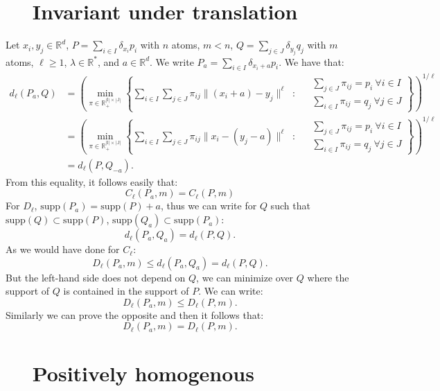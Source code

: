 \documentclass{amsart}
\newcommand{\RR}{\mathbb{R}}
\begin{document}
\begin{appendices}
\section{$\quad$ Invariant under translation }\label{appendix restrict}
\noindent Let $x_i,y_j\in\RR^d$, $P=\sum_{i\in I}\delta_{x_i}p_i$ with $n$ atoms, $m<n$, $Q=\sum_{j\in J}\delta_{y_j}q_j$ with $m$ atoms, $\ell\geq1$, $\lambda\in\RR^*$, and $a\in\RR^d$. We write $P_a=\sum_{i\in I}\delta_{x_i+a}p_i$. We have that:
\begin{align*}
d_\ell(P_a,Q)&=\left(\min_{\pi\in\mathbb{R_+^{|I|\times|J|}}}\left\{ 
\sum_{i\in I}\sum_{j\in J}\pi_{ij}\lVert \left(x_i+a\right)-y_j\rVert^\ell \: \text{ : } \:  \begin{aligned}
& \sum_{j\in J}\pi_{ij}=p_i \: \forall i\in I \\
& \sum_{i\in I}\pi_{ij}=q_j \: \forall j\in J
\end{aligned}\right\}\right)^{1/\ell}
\\ &= \left(\min_{\pi\in\mathbb{R_+^{|I|\times|J|}}}\left\{ 
\sum_{i\in I}\sum_{j\in J}\pi_{ij}\lVert x_i-\left(y_j-a\right)\rVert^\ell \: \text{ : } \:  \begin{aligned}
& \sum_{j\in J}\pi_{ij}=p_i \: \forall i\in I \\
& \sum_{i\in I}\pi_{ij}=q_j \: \forall j\in J
\end{aligned}\right\}\right)^{1/\ell}
\\ &=d_\ell\left(P,Q_{-a}\right).
\end{align*}
From this equality, it follows easily that:
$$
C_\ell\left(P_a,m\right)=C_\ell\left(P,m\right)
$$
For $D_\ell$, $\text{supp}\left(P_a\right)=\text{supp}\left(P\right)+a$, thus we can write for $Q$ such that $\text{supp}\left(Q\right)\subset \text{supp}\left(P\right)$, $\text{supp}\left(Q_a\right)\subset \text{supp}\left(P_a\right)$:
$$
d_\ell(P_a,Q_a)=d_\ell(P,Q).
$$
As we would have done for $C_\ell$:
$$
D_\ell\left(P_a,m\right)\leq d_\ell(P_a,Q_a) = d_\ell(P,Q).
$$
But the left-hand side does not depend on $Q$, we can minimize over $Q$ where the support of $Q$ is contained in the support of $P$. We can write:
$$
D_\ell\left(P_a,m\right)\leq D_\ell\left(P,m\right).
$$
Similarly we can prove the opposite and then it follows that:
$$
D_\ell\left(P_a,m\right)= D_\ell\left(P,m\right).
$$
\section{$\quad$ Positively homogenous}\label{appendix homogen}
\end{appendices}
\end{document}
